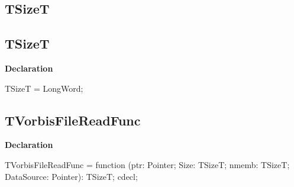 \documentclass{report}
\newif\ifpdf
\begin{document}
\subsection*{\large{\textbf{TSizeT}}\normalsize\hspace{1ex}\hrulefill}
\else
\subsection*{TSizeT}
\fi
\label{ok_vorbisfile-TSizeT}
\begin{list}{}{
\setlength{\itemindent}{0cm}
\setlength{\listparindent}{0cm}
\setlength{\leftmargin}{\evensidemargin}
\addtolength{\leftmargin}{\tmplength}
\settowidth{\labelsep}{X}
\addtolength{\leftmargin}{\labelsep}
\setlength{\labelwidth}{\tmplength}
}
\item[\textbf{Declaration}\hfill]
\ifpdf
\begin{flushleft}
\fi
\begin{ttfamily}
TSizeT = LongWord;\end{ttfamily}

\ifpdf
\end{flushleft}
\fi

\end{list}
\ifpdf
\subsection*{\large{\textbf{TVorbisFileReadFunc}}\normalsize\hspace{1ex}\hrulefill}
\else
\subsection*{TVorbisFileReadFunc}
\fi
\label{ok_vorbisfile-TVorbisFileReadFunc}
\begin{list}{}{
\setlength{\itemindent}{0cm}
\setlength{\listparindent}{0cm}
\setlength{\leftmargin}{\evensidemargin}
\addtolength{\leftmargin}{\tmplength}
\settowidth{\labelsep}{X}
\addtolength{\leftmargin}{\labelsep}
\setlength{\labelwidth}{\tmplength}
}
\item[\textbf{Declaration}\hfill]
\ifpdf
\begin{flushleft}
\fi
\begin{ttfamily}
TVorbisFileReadFunc = function (ptr: Pointer; Size: TSizeT; nmemb: TSizeT; DataSource: Pointer): TSizeT; cdecl;\end{ttfamily}

\ifpdf
\end{flushleft}
\fi

\end{list}
\ifpdf
\end{document}
